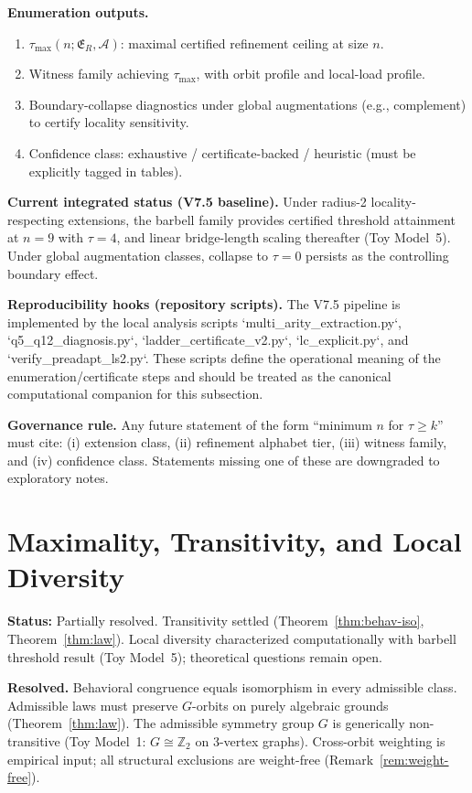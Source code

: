 \documentclass[11pt,a4paper]{article}
\theoremstyle{definition}
\theoremstyle{remark}
\begin{document}
\textbf{Enumeration outputs.}
\begin{enumerate}[label=\textbf{O\arabic*.},nosep]
  \item $\tau_{\max}(n;\mathfrak{E}_R,\mathcal{A})$: maximal certified refinement ceiling at size $n$.
  \item Witness family achieving $\tau_{\max}$, with orbit profile and local-load profile.
  \item Boundary-collapse diagnostics under global augmentations (e.g., complement) to certify locality sensitivity.
  \item Confidence class: exhaustive / certificate-backed / heuristic (must be explicitly tagged in tables).
\end{enumerate}

\textbf{Current integrated status (V7.5 baseline).} Under radius-2 locality-respecting extensions, the barbell family provides certified threshold attainment at $n=9$ with $\tau=4$, and linear bridge-length scaling thereafter (Toy Model~5). Under global augmentation classes, collapse to $\tau=0$ persists as the controlling boundary effect.

\textbf{Reproducibility hooks (repository scripts).} The V7.5 pipeline is implemented by the local analysis scripts `multi_arity_extraction.py`, `q5_q12_diagnosis.py`, `ladder_certificate_v2.py`, `lc_explicit.py`, and `verify_preadapt_ls2.py`. These scripts define the operational meaning of the enumeration/certificate steps and should be treated as the canonical computational companion for this subsection.

\textbf{Governance rule.} Any future statement of the form ``minimum $n$ for $\tau\ge k$'' must cite: (i) extension class, (ii) refinement alphabet tier, (iii) witness family, and (iv) confidence class. Statements missing one of these are downgraded to exploratory notes.

\section{Maximality, Transitivity, and Local Diversity}\label{sec:diversity}

\textbf{Status:} Partially resolved. Transitivity settled (Theorem~\ref{thm:behav-iso}, Theorem~\ref{thm:law}). Local diversity characterized computationally with barbell threshold result (Toy Model~5); theoretical questions remain open.

\textbf{Resolved.} Behavioral congruence equals isomorphism in every admissible class. Admissible laws must preserve $G$-orbits on purely algebraic grounds (Theorem~\ref{thm:law}). The admissible symmetry group $G$ is generically non-transitive (Toy Model~1: $G \cong \mathbb{Z}_2$ on 3-vertex graphs). Cross-orbit weighting is empirical input; all structural exclusions are weight-free (Remark~\ref{rem:weight-free}).
\end{document}
